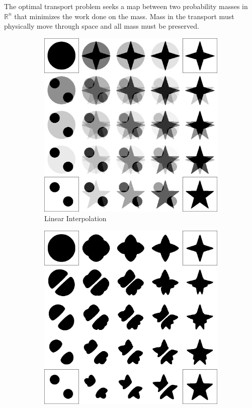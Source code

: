 \documentclass[12pt]{article}
\begin{document}
The optimal transport problem seeks a map between two probability masses in $\mathbb{R}^n$ that minimizes the work done on the mass.
Mass in the transport must physically move through space and all mass must be preserved.
\begin{figure}
  \begin{center}
  \begin{subfigure}[b]{0.45\textwidth}
    \includegraphics[trim={0 27.5cm 0 0},clip,width=\textwidth]{figures/euclidean_gray}
    \caption{Linear Interpolation}
    \label{fig:linear}
  \end{subfigure}
  \hspace{1cm}
  \begin{subfigure}[b]{0.45\textwidth}
    \includegraphics[trim={0 27.5cm 0 0},clip,width=\textwidth]{figures/wasserstein}

\end{subfigure}
\end{center}
\end{figure}
\end{document}
